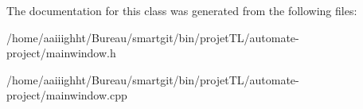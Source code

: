 The documentation for this class was generated from the following files\-:\begin{DoxyCompactItemize}
\item 
/home/aaiiighht/\-Bureau/smartgit/bin/projet\-T\-L/automate-\/project/mainwindow.\-h\item 
/home/aaiiighht/\-Bureau/smartgit/bin/projet\-T\-L/automate-\/project/mainwindow.\-cpp\end{DoxyCompactItemize}
